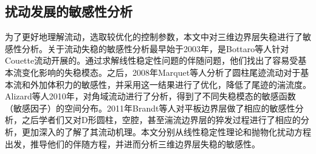 \subsection{扰动发展的敏感性分析}
为了更好地理解流动，选取较优化的控制参数，本文中对三维边界层失稳进行了敏感性分析。关于流动失稳的敏感性分析最早始于2003年，是Bottaro\cite{Bottaro2003}等人针对Couette流动开展的。通过求解线性稳定性问题的伴随问题，他们找出了容易受基本流变化影响的失稳模态。之后，2008年Marquet等人\cite{Marquet2008}分析了圆柱尾迹流动对于基本流和外加体积力的敏感性，并采用这一结果进行了优化，降低了尾迹的湍流度。Alizard等人\cite{Alizard2010}2010年，对角域流动进行了分析，得到了不同失稳模态的敏感函数（敏感因子）的空间分布。2011年Brandt等人\cite{Brandt2011}对平板边界层做了相应的敏感性分析，之后学者们又对D形圆柱\cite{Meliga2012}，空腔\cite{Bromwne2014}，甚至湍流边界层的猝发过程进行了相应的分析\cite{Alizard2015}，更加深入的了解了其流动机理。本文分别从线性稳定性理论和抛物化扰动方程出发，推导他们的伴随方程，并进而分析三维边界层失稳的敏感性。
